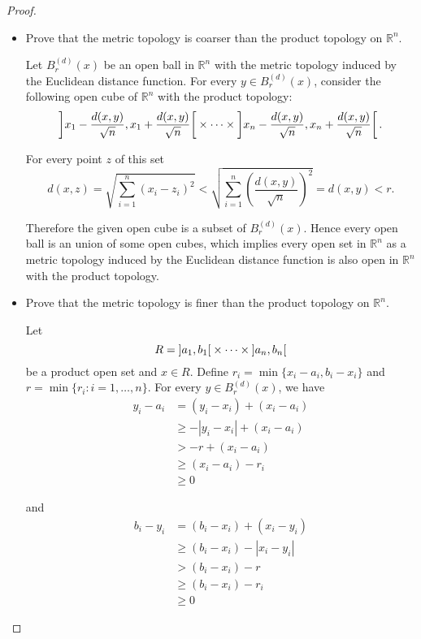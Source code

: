 \begin{proof}
	\begin{itemize}
		\item Prove that the metric topology is coarser than the product topology on $\mathbb{R}^{n}$.

		      Let $B^{(d)}_{r}(x)$ be an open ball in $\mathbb{R}^{n}$ with the metric topology induced by the Euclidean distance function. For every $y\in B^{(d)}_{r}(x)$, consider the following open cube of $\mathbb{R}^{n}$ with the product topology:
		      \[
			      \left]{x_{1} - \frac{d(x, y)}{\sqrt{n}}, x_{1} + \frac{d(x, y)}{\sqrt{n}}}\right[\times\cdots\times\left]{x_{n} - \frac{d(x, y)}{\sqrt{n}}, x_{n} + \frac{d(x, y)}{\sqrt{n}}}\right[.
		      \]

		      For every point $z$ of this set
		      \[
			      d(x, z) = \sqrt{\sum^{n}_{i=1}{(x_{i} - z_{i})}^{2}} < \sqrt{\sum^{n}_{i=1}{\left(\frac{d(x, y)}{\sqrt{n}}\right)}^{2}} = d(x, y) < r.
		      \]

		      Therefore the given open cube is a subset of $B^{(d)}_{r}(x)$. Hence every open ball is an union of some open cubes, which implies every open set in $\mathbb{R}^{n}$ as a metric topology induced by the Euclidean distance function is also open in $\mathbb{R}^{n}$ with the product topology.
		\item Prove that the metric topology is finer than the product topology on $\mathbb{R}^{n}$.

		      Let
		      \[
			      R = \left]{a_{1},b_{1}}\right[ \times\cdots\times \left]{a_{n},b_{n}}\right[
		      \]
		      be a product open set and $x\in R$. Define $r_{i} = \min\{ x_{i} - a_{i}, b_{i} - x_{i} \}$ and $r = \min\{ r_{i} : i = 1,\ldots, n \}$. For every $y\in B^{(d)}_{r}(x)$, we have
		      \begin{align*}
			      y_{i} - a_{i} & = (y_{i} - x_{i}) + (x_{i} - a_{i})                          \\
			                    & \geq -\left\vert{y_{i} - x_{i}}\right\vert + (x_{i} - a_{i}) \\
			                    & > -r + (x_{i} - a_{i})                                       \\
			                    & \geq (x_{i} - a_{i}) - r_{i}                                 \\
			                    & \geq 0
		      \end{align*}

		      and
		      \begin{align*}
			      b_{i} - y_{i} & = (b_{i} - x_{i}) + (x_{i} - y_{i})                         \\
			                    & \geq (b_{i} - x_{i}) - \left\vert{x_{i} - y_{i}}\right\vert \\
			                    & > (b_{i} - x_{i}) - r                                       \\
			                    & \geq (b_{i} - x_{i}) - r_{i}                                \\
			                    & \geq 0
		      \end{align*}


\end{itemize}
\end{proof}
